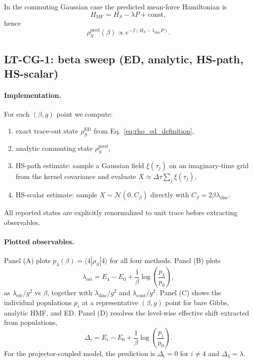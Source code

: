 In the commuting Gaussian case the predicted mean-force Hamiltonian is
\begin{equation}
H_{\mathrm{MF}}=H_S-\lambda P+\mathrm{const},
\label{eq:hmf_projector_form}
\end{equation}
hence
\begin{equation}
\rho_S^{\mathrm{pred}}(\beta)\propto e^{-\beta(H_S-\lambda_{\mathrm{disc}}P)}.
\end{equation}

\subsection{LT-CG-1: beta sweep (ED, analytic, HS-path, HS-scalar)}

\paragraph*{Implementation.}
For each $(\beta,g)$ point we compute:
\begin{enumerate}
\item exact trace-out state $\rho_S^{\mathrm{ED}}$ from Eq.~\eqref{eq:rho_ed_definition},
\item analytic commuting state $\rho_S^{\mathrm{pred}}$,
\item HS-path estimate: sample a Gaussian field $\xi(\tau_j)$ on an imaginary-time
grid from the kernel covariance and evaluate
$X\approx\Delta\tau\sum_j\xi(\tau_j)$,
\item HS-scalar estimate: sample $X\sim\mathcal N(0,C_\beta)$ directly with
$C_\beta=2\beta\lambda_{\mathrm{disc}}$.
\end{enumerate}
All reported states are explicitly renormalized to unit trace before extracting
observables.

\paragraph*{Plotted observables.}
Panel (A) plots $p_4(\beta)=\langle 4|\rho_S|4\rangle$ for all four methods.
Panel (B) plots
\begin{equation}
\lambda_{\mathrm{est}}
=
E_4-E_0+\frac{1}{\beta}\log\!\left(\frac{p_4}{p_0}\right),
\label{eq:lambda_est}
\end{equation}
as $\lambda_{\mathrm{est}}/g^2$ vs $\beta$, together with
$\lambda_{\mathrm{disc}}/g^2$ and $\lambda_{\mathrm{cont}}/g^2$.
Panel (C) shows the individual populations $p_i$ at a representative
$(\beta,g)$ point for bare Gibbs, analytic HMF, and ED.
Panel (D) resolves the level-wise effective shift extracted from populations,
\begin{equation}
\Delta_i
=
E_i-E_0+\frac{1}{\beta}\log\!\left(\frac{p_i}{p_0}\right).
\label{eq:delta_i_est}
\end{equation}
For the projector-coupled model, the prediction is $\Delta_i=0$ for $i\neq 4$
and $\Delta_4=\lambda$.


